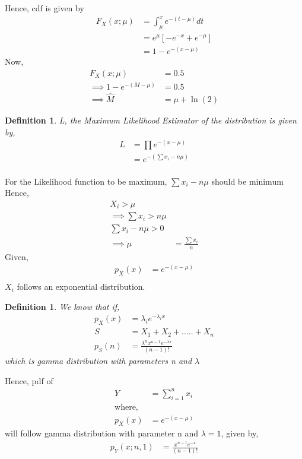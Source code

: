 \documentclass[]{article}
\newtheorem{definition}[problem]{Definition}
\theoremstyle{remark}
\begin{document}
Hence, cdf is given by
\begin{align}
F_X(x; \mu) &= \int_{\mu}^{x} e^{-(t-\mu)}dt\\ 
&= e^{\mu}[-e^{-x} + e^{-\mu}]\\
&= 1 - e^{-(x-\mu)}
\end{align}
Now,
\begin{align}
F_X(x; \mu) &= 0.5\\
\implies 1 - e^{-(M-\mu)} &= 0.5\\
\implies \hat{M} &= \mu + \ln(2)
\label{eq:39}
\end{align}
\begin{definition}
L, the Maximum Likelihood Estimator of the distribution is given by,
\begin{align}
L &= \prod e^{-(x-\mu)}\\
&= e^{-(\sum x_i-n\mu)}\\
\end{align}
\end{definition}
For the Likelihood function to be maximum,
$\sum x_i-n\mu$ should be minimum
Hence,
\begin{align}
X_i > \mu\\
\implies \sum x_i > n\mu\\
\sum x_i-n\mu > 0\\
\implies \mu &= \frac{\sum x_i}{n}
\end{align}
Given,
\begin{align}
p_X(x) &= e^{-(x-\mu)}\\
\end{align}
$X_i$ follows an exponential distribution.
\begin{definition}
We know that if,
\begin{align}
p_X(x) &= \lambda_ie^{-\lambda_ix}\\
S &= X_1 + X_2 +..... +X_n\\
p_S(n) &= \frac{\lambda^nx^{n-1}e^{-\lambda x}}{(n-1)!}
\end{align}
which is gamma distribution with parameters n and $\lambda$
\end{definition}
Hence, pdf of 
\begin{align}
Y &= \sum_{i=1}^{n} x_i\\
\text{where,}\\
p_X(x) &= e^{-(x-\mu)}
\end{align}
will follow gamma distribution with parameter n and $\lambda = 1$, given by,
\begin{align}
p_Y(x;n,1) &= \frac{x^{n-1}e^{-x}}{(n-1)!}
\end{align}
\end{document}
